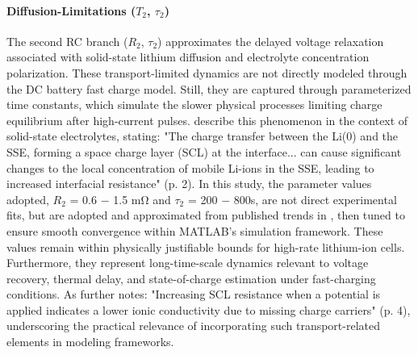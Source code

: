 \documentclass[conference]{IEEEtran}
\begin{document}
\paragraph{\textbf{Diffusion-Limitations ($T_2$, $\tau_2$)}}

The second RC branch ($R_2$, $\tau_2$) approximates the delayed voltage relaxation associated with solid-state lithium diffusion and electrolyte concentration polarization. These transport-limited dynamics are not directly modeled through the DC battery fast charge model. Still, they are captured through parameterized time constants, which simulate the slower physical processes limiting charge equilibrium after high-current pulses. \cite{katzenmeier2023mass} describe this phenomenon in the context of solid-state electrolytes, stating: "The charge transfer between the Li(0) and the SSE, forming a space charge layer (SCL) at the interface... can cause significant changes to the local concentration of mobile Li-ions in the SSE, leading to increased interfacial resistance" (p. 2).
In this study, the parameter values adopted, $R_2$ = 0.6 $-$ 1.5 m\si{\ohm} and $\tau_2$ = 200 $-$ 800s, are not direct experimental fits, but are adopted and approximated from published trends in \cite{Wang}, then tuned to ensure smooth convergence within MATLAB's simulation framework. These values remain within physically justifiable bounds for high-rate lithium-ion cells. Furthermore, they represent long-time-scale dynamics relevant to voltage recovery, thermal delay, and state-of-charge estimation under fast-charging conditions. As \cite{katzenmeier2023mass} further notes: "Increasing SCL resistance when a potential is applied indicates a lower ionic conductivity due to missing charge carriers" (p. 4), underscoring the practical relevance of incorporating such transport-related elements in modeling frameworks.
\end{document}
